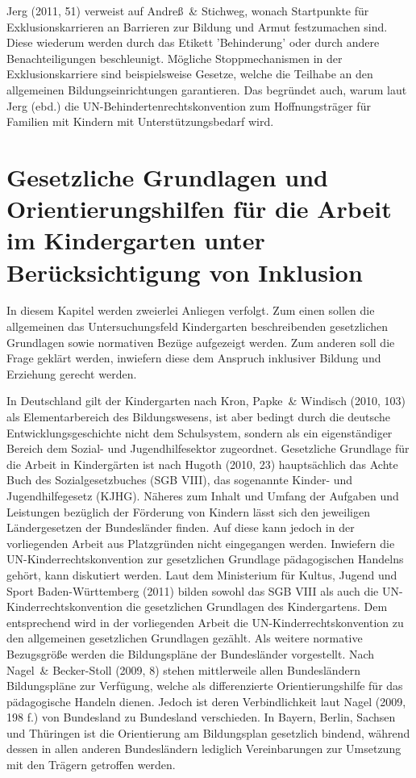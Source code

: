 Jerg (2011, 51) verweist auf Andreß~\& Stichweg, wonach Startpunkte für Exklusionskarrieren an Barrieren zur Bildung und Armut festzumachen sind. Diese wiederum werden durch das Etikett 'Behinderung' oder durch andere Benachteiligungen beschleunigt. Mögliche Stoppmechanismen in der Exklusionskarriere sind beispielsweise Gesetze, welche die Teilhabe an den allgemeinen Bildungseinrichtungen garantieren. Das begründet auch, warum laut Jerg (ebd.) die UN-Behindertenrechtskonvention zum Hoffnungsträger für Familien mit Kindern mit Unterstützungsbedarf wird. 

\section{Gesetzliche Grundlagen und Orientierungshilfen für die Arbeit im Kindergarten unter Berücksichtigung von Inklusion}

In diesem Kapitel werden zweierlei Anliegen verfolgt. Zum einen sollen die allgemeinen das Untersuchungsfeld Kindergarten beschreibenden gesetzlichen Grundlagen sowie normativen Bezüge aufgezeigt werden. Zum anderen soll die Frage geklärt werden, inwiefern diese dem Anspruch inklusiver Bildung und Erziehung gerecht werden. 

In Deutschland gilt der Kindergarten nach Kron, Papke~\& Windisch (2010, 103) als Elementarbereich des Bildungswesens, ist aber bedingt durch die deutsche Entwicklungsgeschichte nicht dem Schulsystem, sondern als ein eigenständiger Bereich dem Sozial- und Jugendhilfesektor zugeordnet. 
Gesetzliche Grundlage für die Arbeit in Kindergärten ist nach Hugoth (2010, 23) hauptsächlich das Achte Buch des Sozialgesetzbuches (SGB VIII), das sogenannte Kinder- und Jugendhilfegesetz (KJHG). Näheres zum Inhalt und Umfang der Aufgaben und Leistungen bezüglich der Förderung von Kindern lässt sich den jeweiligen Ländergesetzen der Bundesländer finden. Auf diese kann jedoch in der vorliegenden Arbeit aus Platzgründen nicht eingegangen werden. Inwiefern die UN-Kinderrechtskonvention zur gesetzlichen Grundlage pädagogischen Handelns gehört, kann diskutiert werden. Laut dem Ministerium für Kultus, Jugend und Sport Baden-Württemberg (2011) bilden sowohl das SGB VIII als auch die UN-Kinderrechtskonvention die gesetzlichen Grundlagen des Kindergartens. Dem entsprechend wird in der vorliegenden Arbeit die UN-Kinderrechtskonvention zu den allgemeinen gesetzlichen Grundlagen gezählt. 
Als weitere normative Bezugsgröße werden die Bildungspläne der Bundesländer vorgestellt. Nach Nagel~\& Becker-Stoll (2009, 8) stehen  mittlerweile allen Bundesländern Bildungspläne zur Verfügung, welche als differenzierte Orientierungshilfe für das pädagogische Handeln dienen. Jedoch ist deren Verbindlichkeit laut Nagel (2009, 198 f.) von Bundesland zu Bundesland verschieden. In Bayern, Berlin, Sachsen und Thüringen ist die Orientierung am Bildungsplan gesetzlich bindend, während dessen in allen anderen Bundesländern lediglich Vereinbarungen zur Umsetzung mit den Trägern getroffen werden.
 
